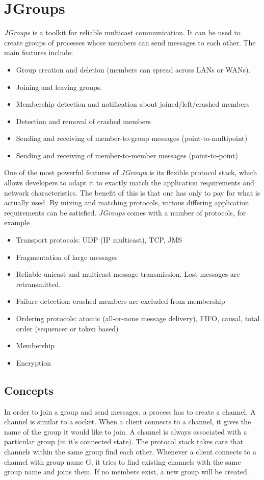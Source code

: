 \section{JGroups}
\label{sect:jgroups}

\emph{JGroups} is a toolkit for reliable multicast communication. It can be used to create groups of processes whose members can send messages to each other. The main features include:

\begin{itemize}
 \item Group creation and deletion (members can spread across LANs or WANs).
 \item Joining and leaving groups.
 \item Membership detection and notification about joined/left/crashed members
 \item Detection and removal of crashed members
 \item Sending and receiving of member-to-group messages (point-to-multipoint)
 \item Sending and receiving of member-to-member messages (point-to-point)
\end{itemize}

One of the most powerful features of \emph{JGroups} is its flexible protocol stack, which allows developers to adapt it to exactly match the application requirements and network characteristics. The benefit of this is that one has only to pay for what is actually used. By mixing and matching protocols, various differing application requirements can be satisfied. \emph{JGroups} comes with a number of protocols, for example

\begin{itemize}
 \item Transport protocols: UDP (IP multicast), TCP, JMS
 \item Fragmentation of large messages
 \item Reliable unicast and multicast message transmission. Lost messages are
       retransmitted.
 \item Failure detection: crashed members are excluded from membership
 \item Ordering protocols: atomic (all-or-none message delivery), FIFO, causal,
       total order (sequencer or token based)
 \item Membership
 \item Encryption
\end{itemize}


\subsection{Concepts}
In order to join a group and send messages, a process has to create a channel. A channel is similar to a socket. When a client connects to a channel, it gives the name of the group it would like to join. A channel is always associated with a particular group (in it's connected state). The protocol stack takes care that channels within the same group find each other. Whenever a client connects to a channel with group name G, it tries to find existing channels with the same group name and joins them. If no members exist, a new group will be created.

